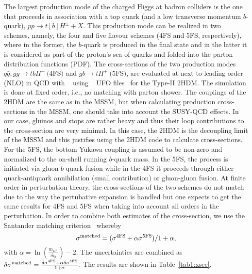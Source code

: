 The largest production mode of the charged Higgs at hadron colliders is the one that proceeds in association with a top quark (and a low transverse momentum $b$-quark), $pp \rightarrow t[b]H^{\pm}+X$. This production mode can be realized in two schemes, namely, the four and five flavour schemes (4FS and 5FS, respectively), where in the former, the $b$-quark is produced in the final state and  in the latter it is considered as part of the proton's sea of quarks and folded into the parton distribution functions (PDF). The cross-sections of the two production modes $q\bar{q}, gg \rightarrow tbH^{\pm} ~\text{(4FS)}$ and $gb \rightarrow tH^{\pm} ~\text{(5FS)}$, are evaluated at next-to-leading order (NLO) in QCD with ~\cite{Alwall:2014hca} using ~\cite{Alloul:2013bka} UFO files~\cite{Degrande:2011ua,Degrande:2014vpa} for the Type-II 2HDM. The simulation is done at fixed order, i.e., no matching with parton shower. The couplings of the 2HDM are the same as in the MSSM, but when calculating production cross-sections in the MSSM, one should take into account the SUSY-QCD effects. In our case, gluinos and stops are rather heavy and thus their loop contributions to the cross-section are very minimal. In this case, the 2HDM is the decoupling limit of the MSSM and this justifies using the 2HDM code to calculate cross-sections. For the 5FS, the bottom Yukawa coupling is assumed to be non-zero and normalized to the on-shell running $b$-quark mass. In the 5FS, the process is initiated via gluon-$b$-quark fusion while in the 4FS it proceeds through either quark-antiquark annihilation (small contribution) or gluon-gluon fusion. At finite order in perturbation theory, the cross-sections of the two schemes do not match due to the way the pertubative expansion is handled but one expects to get the same results for 4FS and 5FS when taking into account all orders in the perturbation. In order to combine both estimates of the cross-section, we use the Santander matching criterion~\cite{Harlander:2011aa} whereby 
\begin{equation}
\sigma^{\rm matched}= ({\sigma^{4\rm FS}+\alpha\sigma^{5\rm FS}})/{1+\alpha},
\label{matched}
\end{equation}  
with $\alpha=\ln\left(\frac{m_{H^{\pm}}}{\bar{m}_b}\right)-2$. The uncertainties are combined as $\delta\sigma^{\rm matched}=\frac{\delta\sigma^{4\rm FS}+\alpha\delta\sigma^{5\rm FS}}{1+\alpha}$. The results are shown in Table~\ref{tab1:xsec}.


